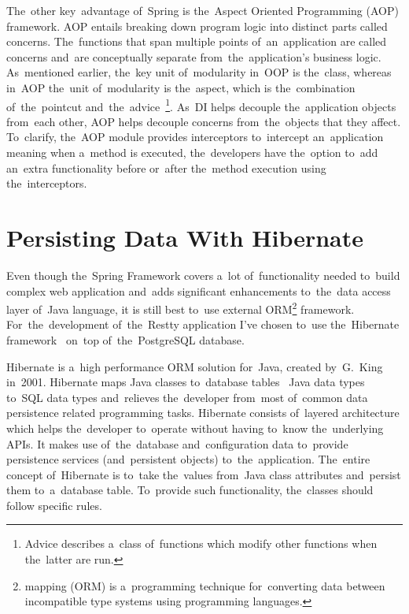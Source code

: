The~other key~advantage of~Spring is the~Aspect Oriented Programming (AOP)
framework. AOP entails breaking down program logic into distinct parts called
concerns. The~functions that span multiple points of~an~application are called
 concerns and~are conceptually separate from~the~application's
business logic. As~mentioned earlier, the~key unit of~modularity in~OOP is
the~class, whereas in~AOP the~unit of~modularity is the~aspect, which is
the~combination of~the~pointcut and~the~advice~\footnote{Advice describes
a~class of~functions which modify other functions when the~latter are run.}.
As~DI helps decouple the~application objects from~each other, AOP helps decouple
 concerns from~the~objects that they affect. To~clarify,
the~AOP module provides interceptors to~intercept an~application meaning when
a~method is executed, the~developers have the~option to~add an~extra
functionality before or~after the~method execution using the~interceptors.



\section{Persisting Data With Hibernate}
Even though the~Spring Framework covers a~lot of~functionality needed to~build
complex web application and~adds significant enhancements to~the~data access
layer of~Java language, it is still best to~use external
ORM\footnote{ mapping (ORM) is a~programming technique
for~converting data between incompatible type systems using
 programming languages.} framework. For~the~development
of~the~Restty application I've chosen to~use the~Hibernate
framework~\cite{Hibernate} on~top of~the~PostgreSQL database.

Hibernate is a~high performance ORM solution for~Java, created by~G.~King
in~2001. Hibernate maps Java classes to~database tables ~Java data types to~SQL
data types and~relieves the~developer from~most of~common data persistence
related programming tasks. Hibernate consists of~layered architecture which
helps the~developer to~operate without having to~know the~underlying APIs. It
makes use of~the~database and~configuration data to~provide persistence services
(and~persistent objects) to~the~application. The~entire concept of~Hibernate is
to~take the~values from~Java class attributes and~persist them to~a~database
table. To~provide such functionality, the~classes should follow specific rules.

